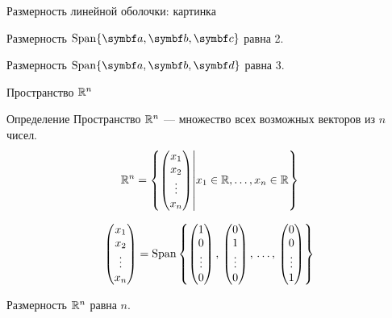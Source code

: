 \begin{frame}{Размерность линейной оболочки: картинка}
\begin{center}
  \end{center}

\pause
Размерность $\Span\{ \ba, \bb, \bc\}$ равна 2.

\pause
Размерность $\Span\{ \ba, \bb, \bd\}$ равна 3.
\end{frame}


\begin{frame}{Пространство $\mathbb{R}^n$}
\begin{block}{Определение} 
\alert{Пространство $\mathbb{R}^n$} — множество всех возможных векторов из $n$ чисел. 
 \[
 \mathbb{R}^n = \left\{ \begin{pmatrix}
 x_1 \\
 x_2 \\
 \vdots \\
 x_n \\
 \end{pmatrix} \middle| x_1 \in \mathbb{R}, \ldots, x_n \in \mathbb{R}
   \right\}  
 \]
\end{block}
\pause
\[
  \begin{pmatrix}
  x_1 \\
  x_2 \\
  \vdots \\
  x_n \\
  \end{pmatrix} = \operatorname{Span}\left\{
\begin{pmatrix}
1 \\
0 \\
\vdots \\
0 \\
\end{pmatrix}, \,
\begin{pmatrix}
0 \\
1 \\
\vdots \\
0 \\
\end{pmatrix}, \, \ldots, \,
\begin{pmatrix}
0 \\
0\\
\vdots \\
1 \\
\end{pmatrix}
\right\}
\]

\pause
Размерность $\mathbb{R}^n$ равна $n$. 


\end{frame}